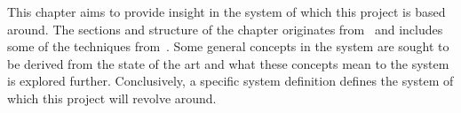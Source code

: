This chapter aims to provide insight in the system of which this project is based around. The sections and structure of the chapter originates from~\cite{mathiassen2001objektorienteret} and includes some of the techniques from~\cite{benyon2013designing}. Some general concepts in the system are sought to be derived from the state of the art and what these concepts mean to the system is explored further. Conclusively, a specific system definition defines the system of which this project will revolve around.
